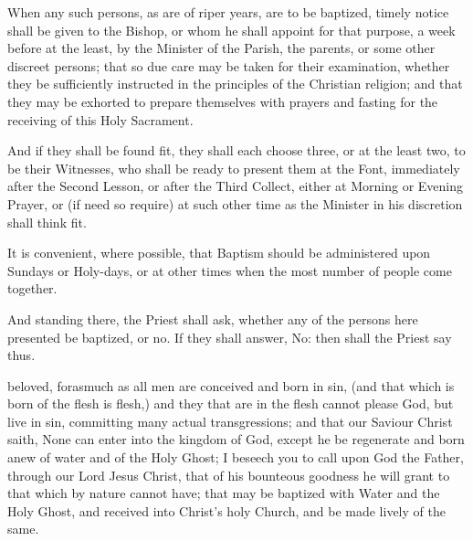 
\begin{rubric}
When any such persons, as are of riper years, are to be baptized, timely notice shall be given to the Bishop, or whom he shall appoint for that purpose, a week before at the least, by the Minister of the Parish, the parents, or some other discreet persons; that so due care may be taken for their examination, whether they be sufficiently instructed in the principles of the Christian religion; and that they may be exhorted to prepare themselves with prayers and fasting for the receiving of this Holy Sacrament.
\end{rubric}

\begin{leftbar}

\begin{rubric}
And if they shall be found fit, they shall each choose three, or at the least two, to be their Witnesses, who shall be ready to present them at the Font, immediately after the Second Lesson, or after the Third Collect, either at Morning or Evening Prayer, or (if need so require) at such other time as the Minister in his discretion shall think fit.
\end{rubric}

\begin{rubric}
It is convenient, where possible, that Baptism should be administered upon Sundays or Holy-days, or at other times when the most number of people come together.
\end{rubric}

\end{leftbar}

\begin{rubric}
And standing there, the Priest shall ask, whether any of the persons here presented be baptized, or no.
If they shall answer, No: then shall the Priest say thus.
\end{rubric}

 beloved, forasmuch as all men are conceived and born in sin, (and that which is born of the flesh is flesh,) and they that are in the flesh cannot please God, but live in sin, committing many actual transgressions; and that our Saviour Christ saith, None can enter into the kingdom of God, except he be regenerate and born anew of water and of the Holy Ghost; I beseech you to call upon God the Father, through our Lord Jesus Christ, that of his bounteous goodness he will grant to  that which by nature  cannot have; that  may be baptized with Water and the Holy Ghost, and received into Christ's holy Church, and be made lively  of the same.

